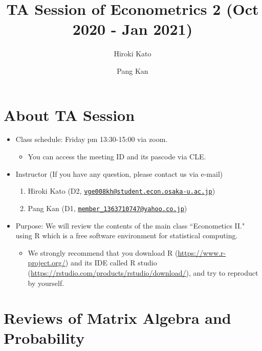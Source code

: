 \documentclass[
  12pt,
]{article}
\title{TA Session of Econometrics 2 (Oct 2020 - Jan 2021)}
\author{Hiroki Kato \and Pang Kan}
\date{}
\providecommand{\tightlist}{%
  \setlength{\itemsep}{0pt}\setlength{\parskip}{0pt}}
\begin{document}
\maketitle

{
\setcounter{tocdepth}{2}
\tableofcontents
}
\hypertarget{about-ta-session}{%
\section{About TA Session}\label{about-ta-session}}

\begin{itemize}
\tightlist
\item
  Class schedule: Friday pm 13:30-15:00 via zoom.

  \begin{itemize}
  \tightlist
  \item
    You can access the meeting ID and its pascode via CLE.
  \end{itemize}
\item
  Instructor (If you have any question, please contact us via e-mail)

  \begin{enumerate}
  \def\labelenumi{\arabic{enumi}.}
  \tightlist
  \item
    Hiroki Kato (D2, \href{mailto:vge008kh@student.econ.osaka-u.ac.jp}{\nolinkurl{vge008kh@student.econ.osaka-u.ac.jp}})
  \item
    Pang Kan (D1, \href{mailto:member_1363710747@yahoo.co.jp}{\nolinkurl{member\_1363710747@yahoo.co.jp}})
  \end{enumerate}
\item
  Purpose: We will review the contents of the main class ``Econometics II." using R which is a free software environment for statistical computing.

  \begin{itemize}
  \tightlist
  \item
    We strongly recommend that you download R (\url{https://www.r-project.org/}) and its IDE called R studio (\url{https://rstudio.com/products/rstudio/download/}), and try to reproduct by yourself.
  \end{itemize}
\end{itemize}

\hypertarget{reviews-of-matrix-algebra-and-probability}{%
\section{Reviews of Matrix Algebra and Probability}\label{reviews-of-matrix-algebra-and-probability}}
\end{document}
